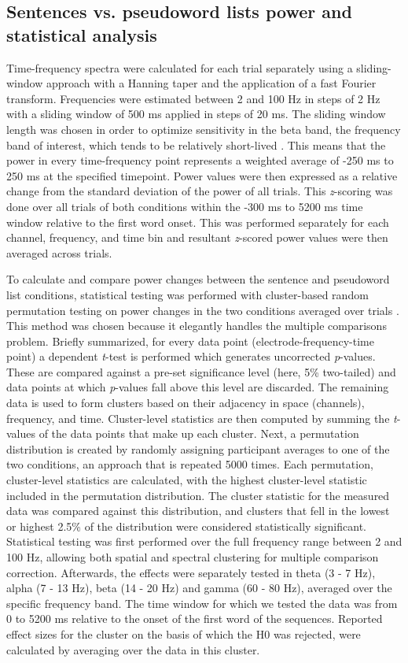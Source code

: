 \subsection*{Sentences vs. pseudoword lists power and statistical analysis}
Time-frequency spectra were calculated for each trial separately using a sliding-window approach with a Hanning taper and the application of a fast Fourier transform. Frequencies were estimated between 2 and 100 Hz in steps of 2 Hz with a sliding window of 500 ms applied in steps of 20 ms. The sliding window length was chosen in order to optimize sensitivity in the beta band, the frequency band of interest, which tends to be relatively short-lived \citep{jones2016}. This means that the power in every time-frequency point represents a weighted average of -250 ms to 250 ms at the specified timepoint. Power values were then expressed as a relative change from the standard deviation of the power of all trials. This \textit{z}-scoring was done over all trials of both conditions within the -300 ms to 5200 ms time window relative to the first word onset. This was performed separately for each channel, frequency, and time bin and resultant \textit{z}-scored power values were then averaged across trials. 

To calculate and compare power changes between the sentence and pseudoword list conditions, statistical testing was performed with cluster-based random permutation testing on power changes in the two conditions averaged over trials \citep{maris2007}. This method was chosen because it elegantly handles the multiple comparisons problem. Briefly summarized, for every data point (electrode-frequency-time point) a dependent \textit{t}-test is performed which generates uncorrected \textit{p}-values. These are compared against a pre-set significance level (here, 5\% two-tailed) and data points at which \textit{p}-values fall above this level are discarded. The remaining data is used to form clusters based on their adjacency in space (channels), frequency, and time. Cluster-level statistics are then computed by summing the \textit{t}-values of the data points that make up each cluster. Next, a permutation distribution is created by randomly assigning participant averages to one of the two conditions, an approach that is repeated 5000 times. Each permutation, cluster-level statistics are calculated, with the highest cluster-level statistic included in the permutation distribution. The cluster statistic for the measured data was compared against this distribution, and clusters that fell in the lowest or highest 2.5\% of the distribution were considered statistically significant. Statistical testing was first performed over the full frequency range between 2 and 100 Hz, allowing both spatial and spectral clustering for multiple comparison correction. Afterwards, the effects were separately tested in theta (3 - 7 Hz), alpha (7 - 13 Hz), beta (14 - 20 Hz) and gamma (60 - 80 Hz), averaged over the specific frequency band. The time window for which we tested the data was from 0 to 5200 ms relative to the onset of the first word of the sequences. Reported effect sizes for the cluster on the basis of which the H0 was rejected, were calculated by averaging over the data in this cluster. 

